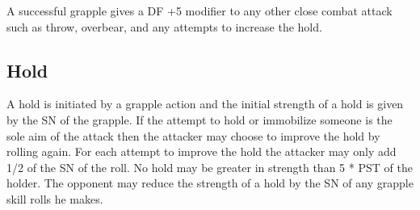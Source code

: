 A successful grapple gives a DF +5 modifier to any other close combat
attack such as throw, overbear, and any attempts to increase the hold.

\subsection{Hold}

A hold is initiated by a grapple action and the initial strength of a
hold is given by the SN of the grapple. If the attempt to hold or
immobilize someone is the sole aim of the attack then the attacker
may choose to improve the hold by rolling again. For each attempt to
improve the hold the attacker may only add 1/2 of the SN of the roll.
No hold may be greater in strength than 5 * PST of the holder.
The opponent may reduce the strength of a hold by the SN of any
grapple skill rolls he makes.

